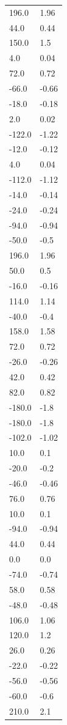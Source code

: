\begin{longtable}{ll}
196.0 & 1.96 \\
44.0 & 0.44 \\
150.0 & 1.5 \\
4.0 & 0.04 \\
72.0 & 0.72 \\
-66.0 & -0.66 \\
-18.0 & -0.18 \\
2.0 & 0.02 \\
-122.0 & -1.22 \\
-12.0 & -0.12 \\
4.0 & 0.04 \\
-112.0 & -1.12 \\
-14.0 & -0.14 \\
-24.0 & -0.24 \\
-94.0 & -0.94 \\
-50.0 & -0.5 \\
196.0 & 1.96 \\
50.0 & 0.5 \\
-16.0 & -0.16 \\
114.0 & 1.14 \\
-40.0 & -0.4 \\
158.0 & 1.58 \\
72.0 & 0.72 \\
-26.0 & -0.26 \\
42.0 & 0.42 \\
82.0 & 0.82 \\
-180.0 & -1.8 \\
-180.0 & -1.8 \\
-102.0 & -1.02 \\
10.0 & 0.1 \\
-20.0 & -0.2 \\
-46.0 & -0.46 \\
76.0 & 0.76 \\
10.0 & 0.1 \\
-94.0 & -0.94 \\
44.0 & 0.44 \\
0.0 & 0.0 \\
-74.0 & -0.74 \\
58.0 & 0.58 \\
-48.0 & -0.48 \\
106.0 & 1.06 \\
120.0 & 1.2 \\
26.0 & 0.26 \\
-22.0 & -0.22 \\
-56.0 & -0.56 \\
-60.0 & -0.6 \\
210.0 & 2.1 \\

\end{longtable}
